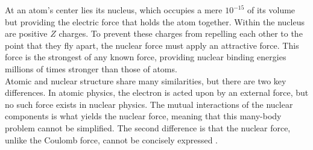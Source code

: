 \documentclass{subfiles}
\begin{document}
	At an atom's center lies its nucleus, which occupies a mere \(10^{-15}\) of its volume but providing the electric force that holds the atom together. Within the nucleus are positive \(Z\) charges. To prevent these charges from repelling each other to the point that they fly apart, the nuclear force must apply an attractive force. This force is the strongest of any known force, providing nuclear binding energies millions of times stronger than those of atoms. \\
	Atomic and nuclear structure share many similarities, but there are two key differences. In atomic physics, the electron is acted upon by an external force, but no such force exists in nuclear physics. The mutual interactions of the nuclear components is what yields the nuclear force, meaning that this many-body problem cannot be simplified. The second difference is that the nuclear force, unlike the Coulomb force, cannot be concisely expressed .
\end{document}
